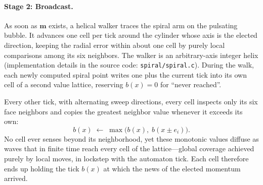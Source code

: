\documentclass{ijuc}
\begin{document}
\paragraph{Stage 2: Broadcast.}  As soon as $\boldsymbol{m}$ exists, a helical walker traces the spiral arm on the pulsating bubble.  It advances one cell per tick around the cylinder whose axis is the elected direction, keeping the radial error within about one cell by purely local comparisons among its six neighbors.  The walker is an arbitrary-axis integer helix (implementation details in the source code: \texttt{spiral/spiral.c}).  During the walk, each newly computed spiral point writes one plus the current tick into its own cell of a second value lattice, reserving $b(x)=0$ for ``never reached''.

Every other tick, with alternating sweep directions, every cell inspects only its six face neighbors and copies the greatest neighbor value whenever it exceeds its own:
\[
b(x)\;\leftarrow\;\max\bigl(b(x),\;b(x\pm e_i)\bigr).
\]
No cell ever senses beyond its neighborhood, yet these monotonic values diffuse as waves that in finite time reach every cell of the lattice---global coverage achieved purely by local moves, in lockstep with the automaton tick.  Each cell therefore ends up holding the tick $b(x)$ at which the news of the elected momentum arrived.
\end{document}
